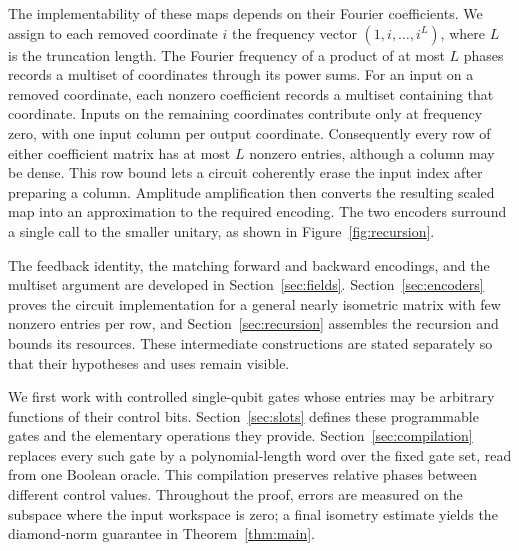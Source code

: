 The implementability of these maps depends on their Fourier coefficients.
We assign to each removed coordinate $i$ the frequency vector
$(1,i,\ldots,i^L)$, where $L$ is the truncation length.  The Fourier frequency of a product of at most
$L$ phases records a multiset of coordinates through its power sums.  For
an input on a removed coordinate, each nonzero coefficient records a
multiset containing that coordinate.  Inputs on the remaining coordinates
contribute only at frequency zero, with one input column per output coordinate.  Consequently every row of either
coefficient matrix has at most $L$ nonzero entries, although a column may
be dense.  This row bound lets a
circuit coherently erase the input index after preparing a column.  Amplitude
amplification then converts the resulting scaled map into an approximation
to the required encoding.  The two encoders surround a single call to the
smaller unitary, as shown in Figure~\ref{fig:recursion}.

The feedback identity, the matching forward and backward encodings, and the
multiset argument are developed in Section~\ref{sec:fields}.
Section~\ref{sec:encoders} proves the circuit implementation for a general
nearly isometric matrix with few nonzero entries per row, and
Section~\ref{sec:recursion} assembles the recursion and bounds its resources.
These intermediate constructions are stated separately so that their
hypotheses and uses remain visible.

We first work with controlled single-qubit gates whose entries may be
arbitrary functions of their control bits.  Section~\ref{sec:slots} defines
these programmable gates and the elementary operations they provide.
Section~\ref{sec:compilation} replaces every such gate by a polynomial-length
word over the fixed gate set, read from one Boolean oracle.  This compilation
preserves relative phases between different control values.  Throughout the
proof, errors are measured on the subspace where the input workspace is zero;
a final isometry estimate yields the diamond-norm guarantee in
Theorem~\ref{thm:main}.
